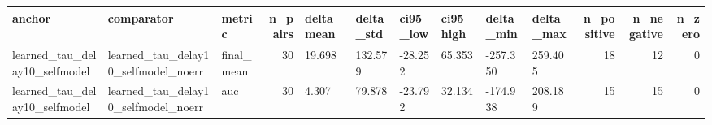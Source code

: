 \begin{tabular}{lllrllllllrrr}
\toprule
anchor & comparator & metric & n_pairs & delta_mean & delta_std & ci95_low & ci95_high & delta_min & delta_max & n_positive & n_negative & n_zero \\
\midrule
learned_tau_delay10_selfmodel & learned_tau_delay10_selfmodel_noerr & final_mean & 30 & 19.698 & 132.579 & -28.252 & 65.353 & -257.350 & 259.405 & 18 & 12 & 0 \\
learned_tau_delay10_selfmodel & learned_tau_delay10_selfmodel_noerr & auc & 30 & 4.307 & 79.878 & -23.792 & 32.134 & -174.938 & 208.189 & 15 & 15 & 0 \\
\bottomrule
\end{tabular}
